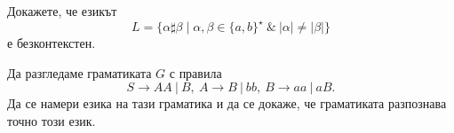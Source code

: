\begin{problem}
  Докажете, че езикът
  \[L = \{\alpha \sharp \beta \mid \alpha,\beta \in \{a,b\}^\star\ \&\ |\alpha| \neq |\beta| \}\]
  е безконтекстен.
\end{problem}

\begin{problem}
  Да разгледаме граматиката $G$ с правила
  \[S \to AA\ |\ B,\ A \to B\ |\ bb,\ B \to aa\ |\ aB.\]
  Да се намери езика на тази граматика и да се докаже, че граматиката разпознава точно този език.
\end{problem}

